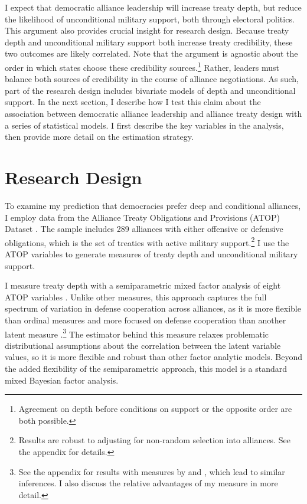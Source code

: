\documentclass[12pt]{article}
\begin{document}
I expect that democratic alliance leadership will increase treaty depth, but reduce the likelihood of unconditional military support, both through electoral politics. 
This argument also provides crucial insight for research design. 
Because treaty depth and unconditional military support both increase treaty credibility, these two outcomes are likely correlated.
Note that the argument is agnostic about the order in which states choose these credibility sources.\footnote{Agreement on depth before conditions on support or the opposite order are both possible.}
Rather, leaders must balance both sources of credibility in the course of alliance negotiations. 
As such, part of the research design includes bivariate models of depth and unconditional support. 
In the next section, I describe how I test this claim about the association between democratic alliance leadership and alliance treaty design with a series of statistical models. 
I first describe the key variables in the analysis, then provide more detail on the estimation strategy.


\section{Research Design}


To examine my prediction that democracies prefer deep and conditional alliances, I employ data from the Alliance Treaty Obligations and Provisions (ATOP) Dataset \citep{Leedsetal2002}. 
The sample includes 289 alliances with either offensive or defensive obligations, which is the set of treaties with active military support.\footnote{Results are robust to adjusting for non-random selection into alliances. See the appendix for details.}
I use the ATOP variables to generate measures of treaty depth and unconditional military support. 


I measure treaty depth with a semiparametric mixed factor analysis of eight ATOP variables \citep{Murrayetal2013}.
Unlike other measures, this approach captures the full spectrum of variation in defense cooperation across alliances, as it is more flexible than ordinal measures \citep{LeedsAnac2005} and more focused on defense cooperation than another latent measure \citep{BensonClinton2016}.\footnote{See the appendix for results with measures by \citet{LeedsAnac2005} and \citet{BensonClinton2016}, which lead to similar inferences. I also discuss the relative advantages of my measure in more detail.}
The estimator behind this measure relaxes problematic distributional assumptions about the correlation between the latent variable values, so it is more flexible and robust than other factor analytic models. 
Beyond the added flexibility of the semiparametric approach, this model is a standard mixed Bayesian factor analysis. 
\end{document}
